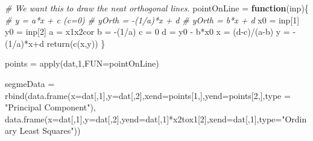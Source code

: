 \documentclass[print]{nuthesis}
\newenvironment{Shaded}{\begin{snugshade}}{\end{snugshade}}
\newcommand{\AttributeTok}[1]{\textcolor[rgb]{0.77,0.63,0.00}{#1}}
\newcommand{\CommentTok}[1]{\textcolor[rgb]{0.56,0.35,0.01}{\textit{#1}}}
\newcommand{\ControlFlowTok}[1]{\textcolor[rgb]{0.13,0.29,0.53}{\textbf{#1}}}
\newcommand{\DecValTok}[1]{\textcolor[rgb]{0.00,0.00,0.81}{#1}}
\newcommand{\FunctionTok}[1]{\textcolor[rgb]{0.00,0.00,0.00}{#1}}
\newcommand{\NormalTok}[1]{#1}
\newcommand{\OtherTok}[1]{\textcolor[rgb]{0.56,0.35,0.01}{#1}}
\newcommand{\SpecialCharTok}[1]{\textcolor[rgb]{0.00,0.00,0.00}{#1}}
\newcommand{\StringTok}[1]{\textcolor[rgb]{0.31,0.60,0.02}{#1}}
\begin{document}
\begin{Shaded}
\begin{Highlighting}[]
\CommentTok{\# We want this to draw the neat orthogonal lines.}
\NormalTok{pointOnLine }\OtherTok{=} \ControlFlowTok{function}\NormalTok{(inp)\{}
  \CommentTok{\# y = a*x + c (c=0)}
  \CommentTok{\# yOrth = {-}(1/a)*x + d}
  \CommentTok{\# yOrth = b*x + d}
\NormalTok{  x0 }\OtherTok{=}\NormalTok{ inp[}\DecValTok{1}\NormalTok{] }
\NormalTok{  y0 }\OtherTok{=}\NormalTok{ inp[}\DecValTok{2}\NormalTok{] }
\NormalTok{  a }\OtherTok{=}\NormalTok{ x1x2cor}
\NormalTok{  b }\OtherTok{=} \SpecialCharTok{{-}}\NormalTok{(}\DecValTok{1}\SpecialCharTok{/}\NormalTok{a)}
\NormalTok{  c }\OtherTok{=} \DecValTok{0}
\NormalTok{  d }\OtherTok{=}\NormalTok{ y0 }\SpecialCharTok{{-}}\NormalTok{ b}\SpecialCharTok{*}\NormalTok{x0}
\NormalTok{  x }\OtherTok{=}\NormalTok{ (d}\SpecialCharTok{{-}}\NormalTok{c)}\SpecialCharTok{/}\NormalTok{(a}\SpecialCharTok{{-}}\NormalTok{b)}
\NormalTok{  y }\OtherTok{=} \SpecialCharTok{{-}}\NormalTok{(}\DecValTok{1}\SpecialCharTok{/}\NormalTok{a)}\SpecialCharTok{*}\NormalTok{x}\SpecialCharTok{+}\NormalTok{d}
  \FunctionTok{return}\NormalTok{(}\FunctionTok{c}\NormalTok{(x,y))}
\NormalTok{\}}

\NormalTok{points }\OtherTok{=} \FunctionTok{apply}\NormalTok{(dat,}\DecValTok{1}\NormalTok{,}\AttributeTok{FUN=}\NormalTok{pointOnLine)}

\NormalTok{segmeData }\OtherTok{=} \FunctionTok{rbind}\NormalTok{(}\FunctionTok{data.frame}\NormalTok{(}\AttributeTok{x=}\NormalTok{dat[,}\DecValTok{1}\NormalTok{],}\AttributeTok{y=}\NormalTok{dat[,}\DecValTok{2}\NormalTok{],}\AttributeTok{xend=}\NormalTok{points[}\DecValTok{1}\NormalTok{,],}\AttributeTok{yend=}\NormalTok{points[}\DecValTok{2}\NormalTok{,],}\AttributeTok{type =} \StringTok{"Principal Component"}\NormalTok{),}
                  \FunctionTok{data.frame}\NormalTok{(}\AttributeTok{x=}\NormalTok{dat[,}\DecValTok{1}\NormalTok{],}\AttributeTok{y=}\NormalTok{dat[,}\DecValTok{2}\NormalTok{],}\AttributeTok{yend=}\NormalTok{dat[,}\DecValTok{1}\NormalTok{]}\SpecialCharTok{*}\NormalTok{x2tox1[}\DecValTok{2}\NormalTok{],}\AttributeTok{xend=}\NormalTok{dat[,}\DecValTok{1}\NormalTok{],}\AttributeTok{type=}\StringTok{"Ordinary Least Squares"}\NormalTok{))}


\end{Highlighting}
\end{Shaded}
\end{document}
